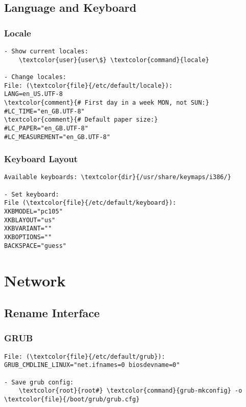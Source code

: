 \documentclass[10pt, a4paper, onecolumn, openany]{book} %
\begin{document}
\section{Language and Keyboard}
\subsection{Locale}
\begin{Verbatim}[commandchars=\\\{\}]
- Show current locales:
    \textcolor{user}{user\$} \textcolor{command}{locale}

- Change locales:
File: (\textcolor{file}{/etc/default/locale}):
LANG=en_US.UTF-8
\textcolor{comment}{# First day in a week MON, not SUN:}
#LC_TIME="en_GB.UTF-8"
\textcolor{comment}{# Default paper size:}
#LC_PAPER="en_GB.UTF-8"
#LC_MEASUREMENT="en_GB.UTF-8"
\end{Verbatim}

\subsection{Keyboard Layout}
\begin{Verbatim}[commandchars=\\\{\}]
Available keyboards: \textcolor{dir}{/usr/share/keymaps/i386/}

- Set keyboard:
File (\textcolor{file}{/etc/default/keyboard}):
XKBMODEL="pc105"
XKBLAYOUT="us"
XKBVARIANT=""
XKBOPTIONS=""
BACKSPACE="guess"
\end{Verbatim}


\chapter{Network}
\section{Rename Interface}
\subsection{GRUB}
\begin{Verbatim}[commandchars=\\\{\}]
File: (\textcolor{file}{/etc/default/grub}):
GRUB_CMDLINE_LINUX="net.ifnames=0 biosdevname=0"

- Save grub config:
    \textcolor{root}{root#} \textcolor{command}{grub-mkconfig} -o \textcolor{file}{/boot/grub/grub.cfg}
\end{Verbatim}
\end{document}
